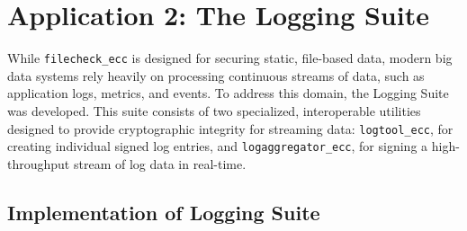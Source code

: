 \chapter{Application 2: The Logging Suite}
While \texttt{filecheck\_ecc} is designed for securing static, file-based data, modern big data systems rely heavily on processing continuous streams of data, such as application logs, metrics, and events. To address this domain, the Logging Suite was developed. This suite consists of two specialized, interoperable utilities designed to provide cryptographic integrity for streaming data: \texttt{logtool\_ecc}, for creating individual signed log entries, and \texttt{logaggregator\_ecc}, for signing a high-throughput stream of log data in real-time.

\section{Implementation of Logging Suite}
